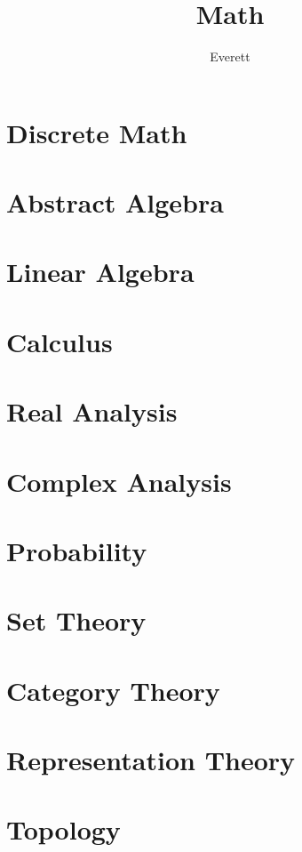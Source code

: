 \documentclass[12pt,a4paper,oneside]{scrbook}
\title{Math}
\author{Everett}
\begin{document}
\frontmatter
\maketitle
\newpage
\tableofcontents

\mainmatter
\part{Discrete Math}
\parttoc
\part{Abstract Algebra}
\parttoc


\part{Linear Algebra}
\parttoc
\part{Calculus}
\parttoc
\part{Real Analysis}
\parttoc
\part{Complex Analysis}
\parttoc
\part{Probability}
\parttoc
\part{Set Theory}
\parttoc
\part{Category Theory}
\parttoc
\part{Representation Theory}
\parttoc
\part{Topology}
\parttoc
\backmatter
\end{document}
